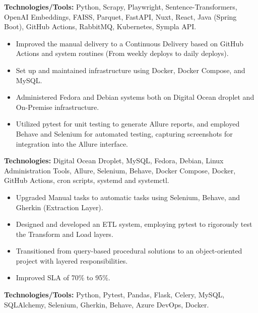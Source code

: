 \documentclass[10pt,a4paper]{altacv}
\begin{document}
\textbf{Technologies/Tools:} Python, Scrapy, Playwright, Sentence-Transformers, OpenAI Embeddings, FAISS, Parquet, FastAPI, Nuxt, React, Java (Spring Boot), GitHub Actions, RabbitMQ, Kubernetes, Sympla API.

\vspace{5mm}

\begin{itemize}
    \setlength{\itemindent}{0.5em}
    \item[--] Improved the manual delivery to a Continuous Delivery based on GitHub Actions and system routines (From weekly deploys to daily deploys).
    \item[--] Set up and maintained infrastructure using Docker, Docker Compose, and MySQL.
    \item[--] Administered Fedora and Debian systems both on Digital Ocean droplet and On-Premise infrastructure.
    \item[--] Utilized pytest for unit testing to generate Allure reports, and employed Behave and Selenium for automated testing, capturing screenshots for integration into the Allure interface.
\end{itemize}
\textbf{Technologies:} Digital Ocean Droplet, MySQL, Fedora, Debian, Linux Administration Tools, Allure, Selenium, Behave, Docker Compose, Docker, GitHub Actions, cron scripts, systemd and systemctl.
\vspace{5mm}

\begin{itemize}
    \setlength{\itemindent}{0.5em}
    \item[--] Upgraded Manual tasks to automatic tasks using Selenium, Behave, and Gherkin (Extraction Layer).
    \item[--] Designed and developed an ETL system, employing pytest to rigorously test the Transform and Load layers.
    \item[--] Transitioned from query-based procedural solutions to an object-oriented project with layered responsibilities.
    \item[--] Improved SLA of 70\% to 95\%.
\end{itemize}
\textbf{Technologies/Tools:} Python, Pytest, Pandas, Flask, Celery, MySQL, SQLAlchemy, Selenium, Gherkin, Behave, Azure DevOps, Docker.
\vspace{5mm}
\end{document}
